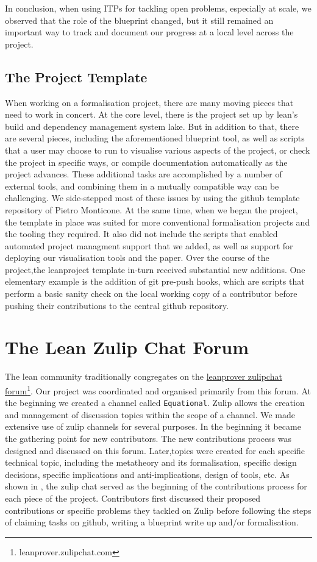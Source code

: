 In conclusion, when using ITPs for tackling open problems, especially at scale, we observed that the role of the blueprint changed, but it still remained an important way to track and document our progress at a local level across the project.

\subsection{The Project Template}
When working on a formalisation project, there are many moving pieces that need to work in concert. At the core level, there is the project set up by lean's build and dependency management system lake. But in addition to that, there are several pieces, including the aforementioned blueprint tool, as well as scripts that a user may choose to run to visualise various aspects of the project, or check the project in specific ways, or compile documentation automatically as the project advances. These additional tasks are accomplished by a number of external tools, and combining them in a mutually compatible way can be challenging. We side-stepped most of these issues by using the github template repository of Pietro Monticone\cite{Monticone_LeanProject_2025}. At the same time, when we began the project, the template in place was suited for more conventional formalisation projects and the tooling they required. It also did not include the scripts that enabled automated project managment support that we added, as well as support for deploying our visualisation tools and the paper. Over the course of the project,the leanproject template in-turn received substantial new additions. One elementary example is the addition of git pre-push hooks, which are scripts that perform a basic sanity check on the local working copy of a contributor before pushing their contributions to the central github repository.

\section{The Lean Zulip Chat Forum}
The lean community traditionally congregates on the \href{leanprover.zulipchat.com}{leanprover zulipchat forum}\footnote{leanprover.zulipchat.com}. Our project was coordinated and organised primarily from this forum. At the beginning we created a channel called \texttt{Equational}. Zulip allows the creation and management of discussion topics within the scope of a channel. We made extensive use of zulip channels for several purposes. In the beginning it became the gathering point for new contributors. The new contributions process was designed and discussed on this forum. Later,topics were created for each specific technical topic, including the metatheory and its formalisation, specific design decisions, specific implications and anti-implications, design of tools, etc. As shown in , the zulip chat served as the beginning of the contributions process for each piece of the project. Contributors first discussed their proposed contributions or specific problems they tackled on Zulip before following the steps of claiming tasks on github, writing a blueprint write up and/or formalisation.


